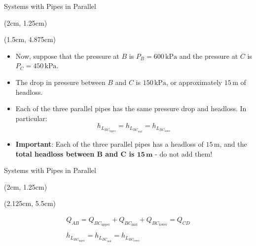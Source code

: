 \documentclass[9pt,xcolor={svgnames, x11names},mathpazo, professionalfonts]{beamer}
\begin{document}
%
\begin{frame}{Systems with Pipes in Parallel}
	
	\begin{textblock*}{0.75\columnwidth}(2cm, 1.25cm)
	\end{textblock*}
	
	\begin{textblock*}{0.935\columnwidth}(1.5cm, 4.875cm)
		\begin{itemize}
			\item Now, suppose that the pressure at $B$ is  $P_B=600\,\text{kPa}$ and the pressure at $C$ is  $P_C=450\,\text{kPa}$. \par
			\item The drop in pressure between $B$ and $C$ is $150\,\text{kPa}$, or approximately $15\,\text{m}$ of headloss.\par
			\item Each of the three parallel pipes has the same pressure drop and headloss. In particular:
			      \vspace{-0.25cm}
			      \[ h_{L_{BC_{\text{upper}}}} = h_{L_{BC_{\text{mid}}}} = h_{L_{BC_{\text{lower}}}} \]
			\item {\bfseries Important}: Each of the three parallel pipes has a headloss of $15\,\text{m}$, and the {\bfseries total headloss between $\bm B$ and $\bm C$ is $\bm{15}\,\textbf{m}$} - do not add them!
		\end{itemize}
	\end{textblock*}
\end{frame}

%
\begin{frame}{Systems with Pipes in Parallel}
	
	\begin{textblock*}{0.75\columnwidth}(2cm, 1.25cm)
	\end{textblock*}
	
	\begin{textblock*}{0.8\columnwidth}(2.125cm, 5.5cm)
		\begin{mybox}[title=Parallel Pipes Results]{}{}
			\begin{gather*}
				Q_{AB} = Q_{BC_\text{upper}} +  Q_{BC_\text{mid}}+ Q_{BC_\text{lower}} = Q_{CD}\\\\
				h_{L_{BC_{\text{upper}}}} = h_{L_{BC_{\text{mid}}}} = h_{L_{BC_{\text{lower}}}}
			\end{gather*}
		\end{mybox}
		
	\end{textblock*}
\end{frame}
\end{document}
